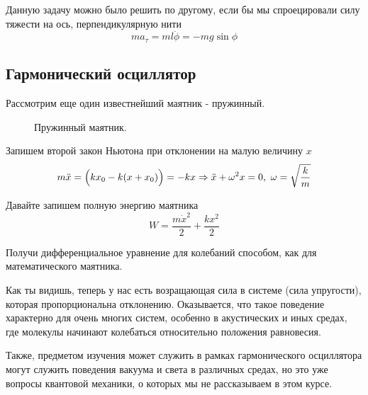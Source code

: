 Данную задачу можно было решить по другому, если бы мы спроецировали силу тяжести на ось, перпендикулярную нити
\begin{equation*}
    m a_{\tau} = m l \ddot{\phi}  = - mg\sin \phi
\end{equation*}

\break

\subsection{Гармонический осциллятор}
Рассмотрим еще один известнейший маятник - пружинный. 

\begin{figure}[h!]
    \caption{Пружинный маятник.}
\end{figure}

Запишем второй закон Ньютона при отклонении на малую величину $x$
\begin{equation*}
    m\ddot{x} = \Bigl(kx_0 - k(x + x_0) \Bigr) = - kx \Rightarrow \ddot{x} + \omega^2 x = 0,\ \omega = \sqrt{\frac{k}{m}}
\end{equation*}

Давайте запишем полную энергию маятника
\begin{equation*}
    W = \frac{m \dot{x}^2}{2} + \frac{kx^2}{2}
\end{equation*}
\begin{prac}
    Получи дифференциальное уравнение для колебаний способом, как для математического маятника.
\end{prac}
Как ты видишь, теперь у нас есть возращающая сила в системе (сила упругости), которая пропорциональна отклонению. Оказывается, что такое поведение характерно для очень многих систем, особенно в акустических и иных средах, где молекулы начинают колебаться относительно положения равновесия.

Также, предметом изучения может служить в рамках гармонического осциллятора могут служить поведения вакуума и света в различных средах, но это уже вопросы квантовой механики, о которых мы не рассказываем в этом курсе.
